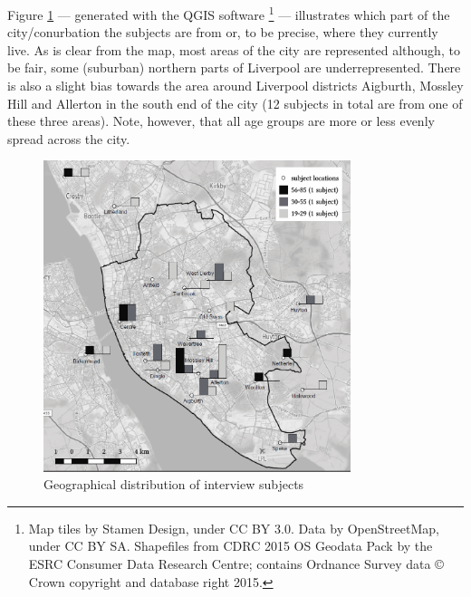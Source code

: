 Figure \ref{fig.map.participants} --- generated with the QGIS software \parencite{QGIS2016}\footnote{Map tiles by Stamen Design, under CC BY 3.0. Data by OpenStreetMap, under CC BY SA. Shapefiles from CDRC 2015 OS Geodata Pack by the ESRC Consumer Data Research Centre; contains Ordnance Survey data © Crown copyright and database right 2015.} --- illustrates which part of the city/conurbation the subjects are from or, to be precise, where they currently live. As is clear from the map, most areas of the city are represented although, to be fair, some (suburban) northern parts of Liverpool are underrepresented. There is also a slight bias towards the area around Liverpool districts Aigburth, Mossley Hill and Allerton in the south end of the city (12 subjects in total are from one of these three areas). Note, however, that all age groups are more or less evenly spread across the city.

	\begin{figure}[h]
		\centering
 		\includegraphics[width=0.8\textwidth]{figures/liverpool-participant-map.png}
		\caption{Geographical distribution of interview subjects}\label{fig.map.participants}
	\end{figure}

